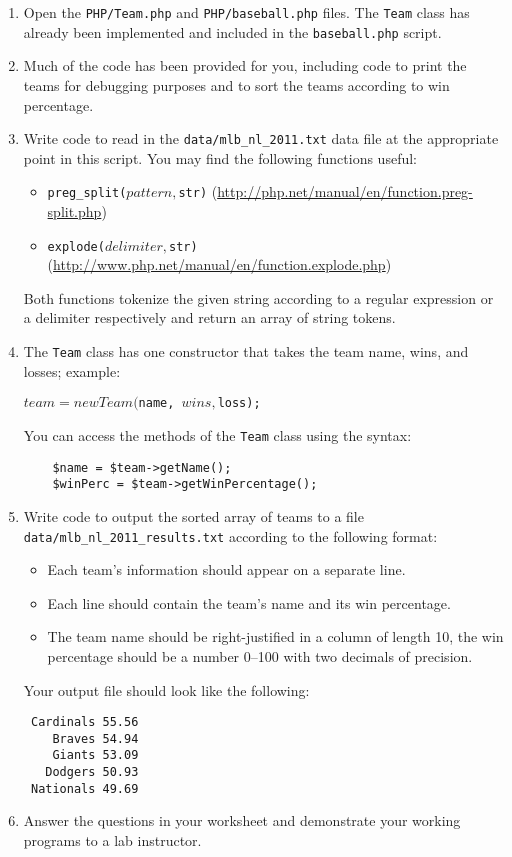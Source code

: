 \documentclass[12pt]{scrartcl}
\begin{document}
\begin{enumerate}
  \item Open the \texttt{PHP/Team.php} and 
  	\texttt{PHP/baseball.php} files.  The \texttt{Team} 
	class has already been implemented and included in the 
	\texttt{baseball.php} script.
  \item Much of the code has been provided for you, including code to 
	print the teams for debugging purposes and to sort the teams according 
	to win percentage.
  \item Write code to read in the \texttt{data/mlb_nl_2011.txt} 
	data file at the appropriate point in this script.  You may find the 
	following functions useful:
  \begin{itemize}
	 \item \texttt{preg_split($pattern, $str)} (\url{http://php.net/manual/en/function.preg-split.php})
	 \item \texttt{explode($delimiter, $str)} (\url{http://www.php.net/manual/en/function.explode.php})
  \end{itemize}
  	Both functions tokenize the given string according to a regular 
	expression or a delimiter respectively and return an array of 
	string tokens.  
  \item The \texttt{Team} class has one constructor that 
	takes the team name, wins, and losses; example:
	
	\texttt{$team = new Team($name, $wins, $loss);}
	
	You can access the methods of the \texttt{Team} class using
	the syntax: 
	
	\begin{verbatim}
	$name = $team->getName();
	$winPerc = $team->getWinPercentage();
	\end{verbatim}
	
  \item Write code to output the sorted array of teams to a file 
  	\texttt{data/mlb_nl_2011_results.txt} according 
	to the following format:
	\begin{itemize}
	  \item Each team's information should appear on a separate line.
	  \item Each line should contain the team's name and its win percentage.
      \item The team name should be right-justified in a column of length 
	  	10, the win percentage should be a number 0--100 with two decimals 
		of precision.
	\end{itemize}
	Your output file should look like the following:

\begin{verbatim}
 Cardinals 55.56
    Braves 54.94
    Giants 53.09
   Dodgers 50.93
 Nationals 49.69
\end{verbatim}

  \item Answer the questions in your worksheet and demonstrate your 
  	working programs to a lab instructor.
\end{enumerate}
\end{document}
